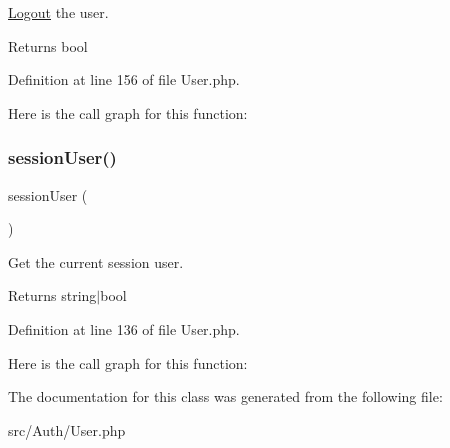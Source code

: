 \mbox{\hyperlink{class_zest_1_1_auth_1_1_logout}{Logout}} the user.

\begin{DoxyReturn}{Returns}
bool 
\end{DoxyReturn}


Definition at line 156 of file User.\+php.

Here is the call graph for this function\+:
\mbox{\label{class_zest_1_1_auth_1_1_user_a94f9bad9e990d4cfcadb21615c859f9a}} 
\subsubsection{\texorpdfstring{session\+User()}{sessionUser()}}
{\footnotesize\ttfamily session\+User (\begin{DoxyParamCaption}{ }\end{DoxyParamCaption})}

Get the current session user.

\begin{DoxyReturn}{Returns}
string$\vert$bool 
\end{DoxyReturn}


Definition at line 136 of file User.\+php.

Here is the call graph for this function\+:


The documentation for this class was generated from the following file\+:\begin{DoxyCompactItemize}
\item 
src/\+Auth/User.\+php\end{DoxyCompactItemize}
